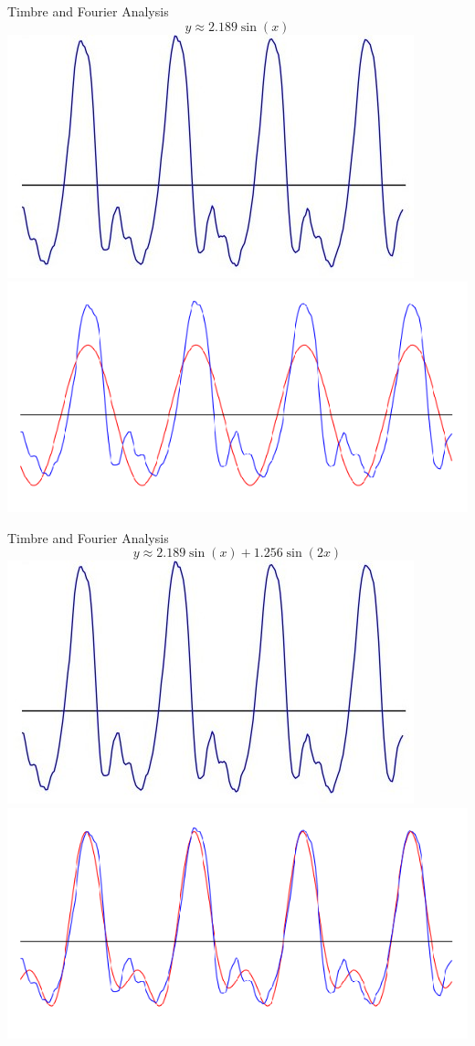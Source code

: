 \documentclass{beamer}
\begin{document}
\begin{frame}{Timbre and Fourier Analysis}
    $$y \approx  2.189\sin(x)$$
    \includegraphics[width=.49\textwidth]{violin_waveform.jpg}
    \includegraphics[width=.49\textwidth]{Violin_Fourier_Frames/frame_1_delay-1s.png}
\end{frame}

\begin{frame}{Timbre and Fourier Analysis}
    $$y \approx  2.189\sin(x) + 1.256\sin(2x)$$
    \includegraphics[width=.49\textwidth]{violin_waveform.jpg}
    \includegraphics[width=.49\textwidth]{Violin_Fourier_Frames/frame_2_delay-1s.png}
\end{frame}
\end{document}
